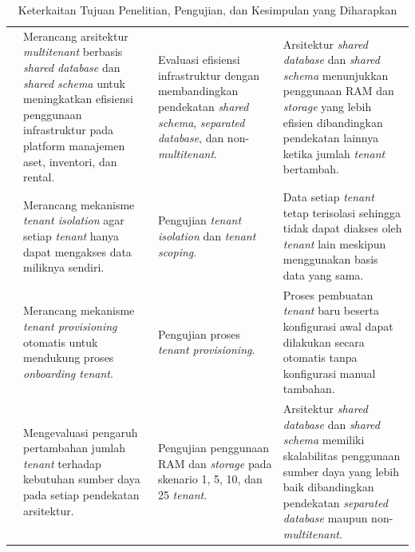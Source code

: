 \begin{table}[H]
  \caption{Keterkaitan Tujuan Penelitian, Pengujian, dan Kesimpulan yang Diharapkan}
  \label{tab:tujuan_pengujian}
  \centering
  \footnotesize
  \setlength{\arrayrulewidth}{0.5pt}
  \setlength{\tabcolsep}{4pt}
  \begin{tabular}{|>{\centering\arraybackslash}p{0.5cm}|>{\raggedright\arraybackslash}p{4.2cm}|>{\raggedright\arraybackslash}p{3.8cm}|>{\raggedright\arraybackslash}p{4.5cm}|}
    \hline
    \multicolumn{1}{|>{\centering\arraybackslash}m{0.5cm}|}{\cellcolor{black}\color{white}\textbf{No}} &
    \multicolumn{1}{>{\centering\arraybackslash}m{4.2cm}|}{\cellcolor{black}\color{white}\textbf{Tujuan Penelitian}} &
    \multicolumn{1}{>{\centering\arraybackslash}m{3.8cm}|}{\cellcolor{black}\color{white}\textbf{Pengujian}} &
    \multicolumn{1}{>{\centering\arraybackslash}m{4.5cm}|}{\cellcolor{black}\color{white}\textbf{Kesimpulan yang Diharapkan}} \\
    \hline
    1 &
    Merancang arsitektur \textit{multitenant} berbasis \textit{shared database} dan \textit{shared schema} untuk meningkatkan efisiensi penggunaan infrastruktur pada platform manajemen aset, inventori, dan rental. &
    Evaluasi efisiensi infrastruktur dengan membandingkan pendekatan \textit{shared schema}, \textit{separated database}, dan non-\textit{multitenant}. &
    Arsitektur \textit{shared database} dan \textit{shared schema} menunjukkan penggunaan RAM dan \textit{storage} yang lebih efisien dibandingkan pendekatan lainnya ketika jumlah \textit{tenant} bertambah. \\
    \hline
    2 &
    Merancang mekanisme \textit{tenant isolation} agar setiap \textit{tenant} hanya dapat mengakses data miliknya sendiri. &
    Pengujian \textit{tenant isolation} dan \textit{tenant scoping}. &
    Data setiap \textit{tenant} tetap terisolasi sehingga tidak dapat diakses oleh \textit{tenant} lain meskipun menggunakan basis data yang sama. \\
    \hline
    3 &
    Merancang mekanisme \textit{tenant provisioning} otomatis untuk mendukung proses \textit{onboarding tenant}. &
    Pengujian proses \textit{tenant provisioning}. &
    Proses pembuatan \textit{tenant} baru beserta konfigurasi awal dapat dilakukan secara otomatis tanpa konfigurasi manual tambahan. \\
    \hline
    4 &
    Mengevaluasi pengaruh pertambahan jumlah \textit{tenant} terhadap kebutuhan sumber daya pada setiap pendekatan arsitektur. &
    Pengujian penggunaan RAM dan \textit{storage} pada skenario 1, 5, 10, dan 25 \textit{tenant}. &
    Arsitektur \textit{shared database} dan \textit{shared schema} memiliki skalabilitas penggunaan sumber daya yang lebih baik dibandingkan pendekatan \textit{separated database} maupun non-\textit{multitenant}. \\
    \hline
  \end{tabular}
\end{table}

